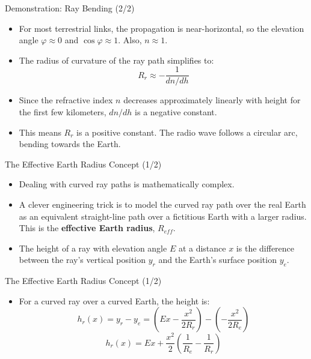 \documentclass{beamer}
\begin{document}
	\begin{frame}{Demonstration: Ray Bending (2/2)}
		\begin{itemize}
			\item For most terrestrial links, the propagation is near-horizontal, so the elevation angle $\varphi \approx 0$ and $\cos\varphi \approx 1$. Also, $n \approx 1$.
			\item The radius of curvature of the ray path simplifies to:
			\[ R_r \approx -\frac{1}{dn/dh} \]
			\item Since the refractive index $n$ decreases approximately linearly with height for the first few kilometers, $dn/dh$ is a negative constant.
			\item This means $R_r$ is a positive constant. The radio wave follows a circular arc, bending towards the Earth.
		\end{itemize}
	\end{frame}
	
	\begin{frame}{The Effective Earth Radius Concept (1/2)}
		\begin{itemize}
			\item Dealing with curved ray paths is mathematically complex.
			\item A clever engineering trick is to model the curved ray path over the real Earth as an equivalent straight-line path over a fictitious Earth with a larger radius. This is the \textbf{effective Earth radius}, $R_{eff}$.
			\item The height of a ray with elevation angle $E$ at a distance $x$ is the difference between the ray's vertical position $y_r$ and the Earth's surface position $y_e$.
		\end{itemize}
	\end{frame}
	
	\begin{frame}{The Effective Earth Radius Concept (1/2)}
		\begin{itemize}
			\item For a curved ray over a curved Earth, the height is:
			\[ h_r(x) = y_r - y_e = \left(Ex - \frac{x^2}{2R_r}\right) - \left(-\frac{x^2}{2R_e}\right) \]
			\[ h_r(x) = Ex + \frac{x^2}{2} \left( \frac{1}{R_e} - \frac{1}{R_r} \right) \]
		\end{itemize}
	\end{frame}
	
\end{document}
